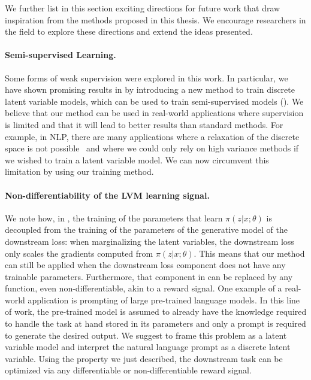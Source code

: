We further list in this section exciting directions for future work
that draw inspiration from the methods proposed in this thesis.
We encourage researchers in the field to explore these directions
and extend the ideas presented.

\paragraph{Semi-supervised Learning.} Some forms of weak
supervision were explored in this work. In particular, we have shown
promising results in  by introducing a new
method to train discrete latent variable models, which can be used to
train semi-supervised models (). We believe that our
method can be used in real-world applications where supervision is
limited and that it will lead to better results than standard
methods. For example, in NLP, there are many applications where a
relaxation of the discrete space is not possible~\citep{Lee2019} and
where we could only rely on high variance methods if we wished to
train a latent variable model. We can now circumvent this limitation
by using our training method.

\paragraph{Non-differentiability of the LVM learning signal.} We note
how, in , the training of the parameters that learn
$\pi(z|x;\theta)$ is decoupled from the training of the parameters of
the generative model of the downstream loss: when marginalizing the
latent variables, the downstream loss only scales the gradients
computed from $\pi(z|x;\theta)$. This means that our method can still
be applied when the downstream loss component does not have any
trainable parameters. Furthermore, that component in 
can be replaced by any function, even non-differentiable, akin to a
reward signal. One example of a real-world application is prompting
of large pre-trained language models. In this line of work, the
pre-trained model is assumed to already have the knowledge required
to handle the task at hand stored in its parameters and only a prompt
is required to generate the desired output. We suggest to frame this
problem as a latent variable model and interpret the natural language
prompt as a discrete latent variable. Using the property we just
described, the downstream task can be optimized via any
differentiable or non-differentiable reward signal.

